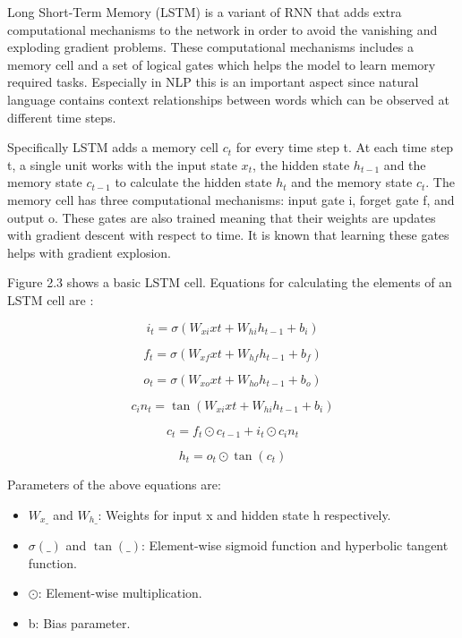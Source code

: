 Long Short-Term Memory (LSTM) is a variant of RNN that adds extra computational mechanisms to the network in order to avoid the vanishing and exploding gradient problems. These computational mechanisms includes a memory cell and a set of logical gates which helps the model to learn memory required tasks. Especially in NLP this is an important aspect since natural language contains context relationships between words which can be observed at different time steps. 

Specifically LSTM adds a memory cell $c_{t}$ for every time step t. At each time step t, a single unit works with the input state $x_{t}$, the hidden state $h_{t-1}$ and the memory state $c_{t-1}$ to calculate the hidden state $h_{t}$ and the memory state $c_{t}$. The memory cell has three computational mechanisms: input gate i, forget gate f, and output o. These gates are also trained meaning that their weights are updates with gradient descent with respect to time. It is known that learning these gates helps with gradient explosion.

Figure 2.3 shows a basic LSTM cell. Equations for calculating the elements of an LSTM cell are \cite{paszke}:

\begin{equation}
i_{t} = \sigma(W_{xi}xt + W_{hi}h_{t-1} + b_{i})
\end{equation}

\begin{equation}
f_{t} = \sigma(W_{xf}xt + W_{hf}h_{t-1} + b_{f})
\end{equation}

\begin{equation}
o_{t} = \sigma(W_{xo}xt + W_{ho}h_{t-1} + b_{o})
\end{equation}

\begin{equation}
c_in_{t} = \tan(W_{xi}xt + W_{hi}h_{t-1} + b_{i})
\end{equation}

\begin{equation}
c_{t} = f_{t} \odot c_{t-1} + i_{t} \odot c_in_{t}
\end{equation}

\begin{equation}
h_{t} = o_{t} \odot \tan(c_{t}) 
\end{equation}

Parameters of the above equations are:

\begin{itemize}

\item $W_{x\_}$ and $W_{h\_}$: Weights for input x and hidden state h respectively.

\item $\sigma(\_)$ and $\tan(\_)$: Element-wise sigmoid function and hyperbolic tangent function.

\item $\odot$: Element-wise multiplication.

\item b: Bias parameter.

\end{itemize}

